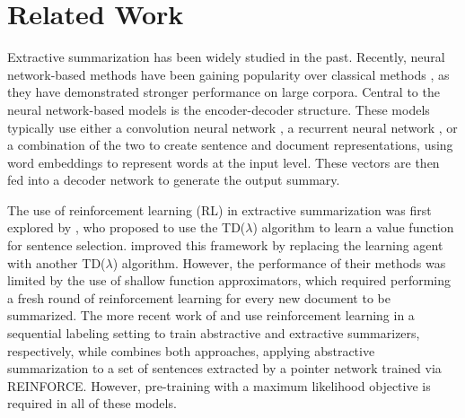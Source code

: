 \documentclass[11pt,a4paper]{article}
\begin{document}
\section{Related Work\label{sec:related-work}}
Extractive summarization has been widely studied in the past. Recently, neural network-based methods have been gaining popularity over classical methods \citep{tra_ext1_luhn1958automatic,tra_ext2_gong2001generic, tra_ext4_conroy2001text,tra_ext3_mihalcea2004textrank,tra_ext5_wong2008extractive}, as they have demonstrated stronger performance on large corpora. Central to the neural network-based models is the encoder-decoder structure. These models typically use either a convolution neural network \cite{cnn1_kalchbrenner2014convolutional,cnn2_kim2014convolutional,ext2_2015Yin,ext3_cao2015learning}, a recurrent neural network \cite{rnn2_chung2014gru,ext4_cheng2016neural,ext5_summarunner}, or a combination of the two \cite{DBLP:Narayan/2018,DBLP:conf/aaai/WuH18} to create sentence and document representations, using word embeddings \cite{we1_mikolov2013efficient,we2_pennington2014glove} to represent words at the input level. These vectors are then fed into a decoder network to generate the output summary. 

The use of reinforcement learning (RL) in extractive summarization was first explored by \citet{rl_ryang2012frameworkRL}, who proposed to use the TD($\lambda$) algorithm to learn a value function for sentence selection. \citet{rl_rioux2014fear} improved this framework by replacing the learning agent with another TD($\lambda$) algorithm. However, the performance of their methods was limited by the use of shallow function approximators, which required performing a fresh round of reinforcement learning for every new document to be summarized. The more recent work of \citet{abs5_paulus2017deep} and \citet{DBLP:conf/aaai/WuH18} use reinforcement learning in a sequential labeling setting to train abstractive and extractive summarizers, respectively, while \citet{chen2018abstractive} combines both approaches, applying abstractive summarization to a set of sentences extracted by a pointer network \citep{vinyals2015pointer} trained via REINFORCE.
However, pre-training with a maximum likelihood objective is required in all of these models.
\end{document}
